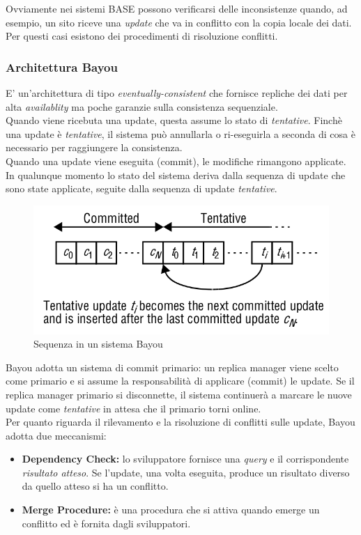 \documentclass{article}
\begin{document}
Ovviamente nei sistemi BASE possono verificarsi delle inconsistenze quando, ad esempio, un sito riceve una \textit{update} che va in conflitto con la copia locale dei dati. Per questi casi esistono dei procedimenti di risoluzione conflitti.

\subsubsection{Architettura Bayou}
E' un'architettura di tipo \textit{eventually-consistent} che fornisce repliche dei dati per alta \textit{availablity} ma poche garanzie sulla consistenza sequenziale.\\
Quando viene ricebuta una update, questa assume lo stato di \textit{tentative}. Finchè una update è \textit{tentative}, il sistema può annullarla o ri-eseguirla a seconda di cosa è necessario per raggiungere la consistenza.\\
Quando una update viene eseguita (commit), le modifiche rimangono applicate. In qualunque momento lo stato del sistema deriva dalla sequenza di update che sono state applicate, seguite dalla sequenza di update \textit{tentative}.
\begin{figure}[H]
    \centering
    \includegraphics[scale=0.4]{img/bayou.png}
    \caption{Sequenza in un sistema Bayou}
\end{figure}\noindent
Bayou adotta un sistema di commit primario: un replica manager viene scelto come primario e si assume la responsabilità di applicare (commit) le update. Se il replica manager primario si disconnette, il sistema continuerà a marcare le nuove update come \textit{tentative} in attesa che il primario torni online.\\
Per quanto riguarda il rilevamento e la risoluzione di conflitti sulle update, Bayou adotta due meccanismi:
\begin{itemize}
    \item \textbf{Dependency Check:} lo sviluppatore fornisce una \textit{query} e il corrispondente \textit{risultato atteso}. Se l'update, una volta eseguita, produce un risultato diverso da quello atteso si ha un conflitto.
    \item \textbf{Merge Procedure:} è una procedura che si attiva quando emerge un conflitto ed è fornita dagli sviluppatori.
\end{itemize}
\end{document}
